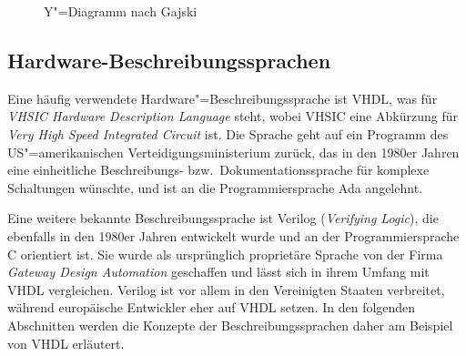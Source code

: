 \begin{figure}[htb]
    \caption{Y"=Diagramm nach Gajski \cite[nach][10]{kesel2013}}
    \label{fpga:entwicklung:ydiagramm}
\end{figure}

\subsection{Hardware-Beschreibungssprachen}

Eine häufig verwendete Hardware"=Beschreibungssprache ist VHDL, was für
\textit{VHSIC Hardware Description Language} steht, wobei VHSIC eine Abkürzung
für \textit{Very High Speed Integrated Circuit} ist. Die Sprache geht auf ein
Programm des US"=amerikanischen Verteidigungsministerium zurück, das in den
1980er Jahren eine einheitliche Beschreibungs- bzw.\ Dokumentationssprache für
komplexe Schaltungen wünschte, und ist an die Programmiersprache Ada angelehnt.
\cite[vgl.][22]{kesel2013}

Eine weitere bekannte Beschreibungssprache ist Verilog
(\textit{Verifying Logic}), die ebenfalls in den 1980er Jahren entwickelt wurde
und an der Programmiersprache C orientiert ist. Sie wurde als ursprünglich
proprietäre Sprache von der Firma \textit{Gateway Design Automation} geschaffen
und lässt sich in ihrem Umfang mit VHDL vergleichen. Verilog ist vor allem in
den Vereinigten Staaten verbreitet, während europäische Entwickler eher auf VHDL
setzen. In den folgenden Abschnitten werden die Konzepte der
Beschreibungssprachen daher am Beispiel von VHDL erläutert.
\cite[vgl.][24--25]{kesel2013}

